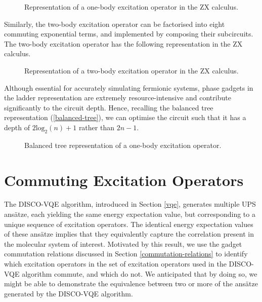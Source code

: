 \begin{figure}[H]
    \centering
    \caption{Representation of a one-body excitation operator in the ZX calculus.}
\end{figure}

Similarly, the two-body excitation operator can be factorised into eight commuting exponential terms, and implemented by composing their subcircuits. The two-body excitation operator has the following representation in the ZX calculus.

\begin{figure}[H]
    \centering
    \caption{Representation of a two-body excitation operator in the ZX calculus.}
\end{figure}

Although essential for accurately simulating fermionic systems, phase gadgets in the ladder representation are extremely resource-intensive and contribute significantly to the circuit depth. Hence, recalling the balanced tree representation (\ref{balanced-tree}), we can optimise the circuit such that it has a depth of $2\text{log}_2(n) + 1$ rather than $2n - 1$.

\begin{figure}[H]
    \centering
    \caption{Balanced tree representation of a one-body excitation operator.}
\end{figure}

\section{Commuting Excitation Operators}

The DISCO-VQE algorithm, introduced in Section \ref{vqe}, generates multiple UPS ansätze, each yielding the same energy expectation value, but corresponding to a unique sequence of excitation operators. The identical energy expectation values of these ansätze implies that they equivalently capture the correlation present in the molecular system of interest. Motivated by this result, we use the gadget commutation relations discussed in Section \ref{commutation-relations} to identify which excitation operators in the set of excitation operators used in the DISCO-VQE algorithm commute, and which do not. We anticipated that by doing so, we might be able to demonstrate the equivalence between two or more of the ansätze generated by the DISCO-VQE algorithm.


